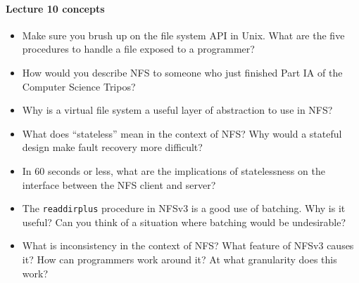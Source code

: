 \documentclass[12pt,a4paper,oneside,openright]{report}
\newcommand{\question}[2]{\paragraph{#1} #2}
\begin{document}
\question{Lecture 10 concepts}{
  \begin{itemize}
  \item Make sure you brush up on the file system API in Unix. What
    are the five procedures to handle a file exposed to a programmer?
  \item How would you describe NFS to someone who just finished Part
    IA of the Computer Science Tripos?
  \item Why is a virtual file system a useful layer of abstraction to
    use in NFS?
  \item What does ``stateless'' mean in the context of NFS? Why would
    a stateful design make fault recovery more difficult?
  \item In 60 seconds or less, what are the implications of
    statelessness on the interface between the NFS client and server?
  \item The \texttt{readdirplus} procedure in NFSv3 is a good use of
    batching. Why is it useful? Can you think of a situation where
    batching would be undesirable?
  \item What is inconsistency in the context of NFS? What feature of
    NFSv3 causes it? How can programmers work around it? At what
    granularity does this work?
  \end{itemize}
}
\end{document}
